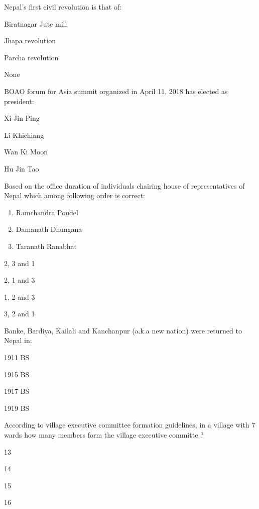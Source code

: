 \begin{questions}
\question Nepal's first civil revolution is that of:
  \begin{items}
  \item* Biratnagar Jute mill
  \item Jhapa revolution
  \item Parcha revolution
  \item None
  \end{items}

\question BOAO forum for Asia summit organized in April 11, 2018 has elected as president:
  \begin{items}
  \item Xi Jin Ping
  \item Li Khichiang
  \item* Wan Ki Moon
  \item Hu Jin Tao
  \end{items}

\question Based on the office duration of individuals chairing house of representatives of Nepal which among following order is correct:
  \begin{enumerate}
  \item Ramchandra Poudel
  \item Damanath Dhungana
  \item Taranath Ranabhat
  \end{enumerate}
  \begin{items}
  \item 2, 3 and 1
  \item* 2, 1 and 3
  \item 1, 2 and 3
  \item 3, 2 and 1
  \end{items}

\question Banke, Bardiya, Kailali and Kanchanpur (a.k.a new nation) were returned to Nepal in:
  \begin{items}
  \item 1911 BS
  \item 1915 BS
  \item* 1917 BS
  \item 1919 BS
  \end{items}

\question According to village executive committee formation guidelines, in a village with 7 wards how many members form the village executive committe ?
  \begin{items}
  \item 13
  \item 14
  \item 15
  \item 16
  \end{items}


\end{questions}
